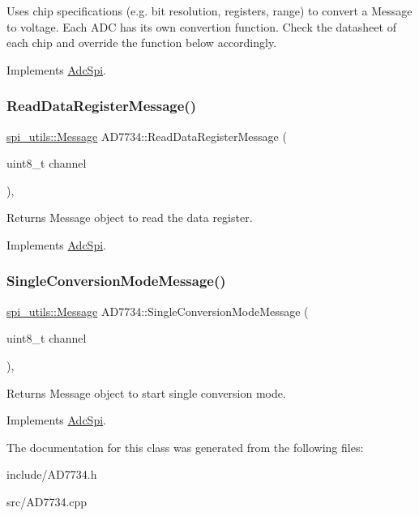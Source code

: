 Uses chip specifications (e.\+g. bit resolution, registers, range) to convert a Message to voltage. Each A\+DC has its own convertion function. Check the datasheet of each chip and override the function below accordingly. 

Implements \mbox{\hyperlink{classAdcSpi_a778d7c86b37cebe4444ec5284f2ea9b7}{Adc\+Spi}}.

\mbox{\label{classAD7734_a6fa5e7c2bd8cde50dccb328d36f12516}} 
\subsubsection{\texorpdfstring{Read\+Data\+Register\+Message()}{ReadDataRegisterMessage()}}
{\footnotesize\ttfamily \mbox{\hyperlink{structspi__utils_1_1Message}{spi\+\_\+utils\+::\+Message}} A\+D7734\+::\+Read\+Data\+Register\+Message (\begin{DoxyParamCaption}\item[{uint8\+\_\+t}]{channel }\end{DoxyParamCaption})\hspace{0.3cm}{\ttfamily [protected]}, {\ttfamily [virtual]}}

Returns Message object to read the data register. 

Implements \mbox{\hyperlink{classAdcSpi_a3578f18e1976d9e2b075a3fbdc003517}{Adc\+Spi}}.

\mbox{\label{classAD7734_af677fbfbae0ec1c78b453ceb4a6736ec}} 
\subsubsection{\texorpdfstring{Single\+Conversion\+Mode\+Message()}{SingleConversionModeMessage()}}
{\footnotesize\ttfamily \mbox{\hyperlink{structspi__utils_1_1Message}{spi\+\_\+utils\+::\+Message}} A\+D7734\+::\+Single\+Conversion\+Mode\+Message (\begin{DoxyParamCaption}\item[{uint8\+\_\+t}]{channel }\end{DoxyParamCaption})\hspace{0.3cm}{\ttfamily [protected]}, {\ttfamily [virtual]}}

Returns Message object to start single conversion mode. 

Implements \mbox{\hyperlink{classAdcSpi_a369da36232861640a113792d2398ce44}{Adc\+Spi}}.



The documentation for this class was generated from the following files\+:\begin{DoxyCompactItemize}
\item 
include/A\+D7734.\+h\item 
src/A\+D7734.\+cpp\end{DoxyCompactItemize}
